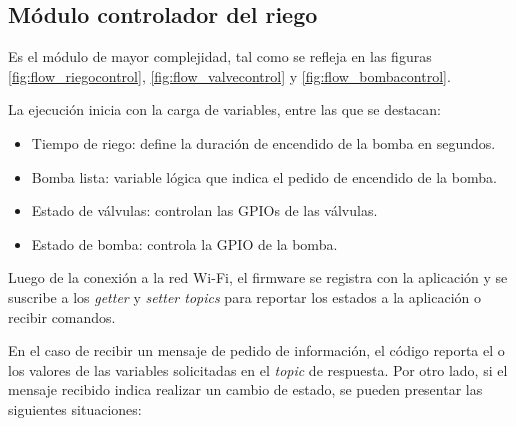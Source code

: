 \subsection{Módulo controlador del riego}
\label{Módulo controlador del riego}

Es el módulo de mayor complejidad, tal como se refleja en las figuras \ref{fig:flow_riegocontrol}, \ref{fig:flow_valvecontrol}  y \ref{fig:flow_bombacontrol}.

La ejecución inicia con la carga de variables, entre las que se destacan:
\begin{itemize}
\item Tiempo de riego: define la duración de encendido de la bomba en segundos.
\item Bomba lista: variable lógica que indica el pedido de encendido de la bomba.
\item Estado de válvulas: controlan las GPIOs de las válvulas.
\item Estado de bomba: controla la GPIO de la bomba.
\end{itemize}

Luego de la conexión a la red Wi-Fi, el firmware se registra con la aplicación y se suscribe a los \textit{getter} y \textit{setter topics} para reportar los estados a la aplicación o recibir comandos.


En el caso de recibir un mensaje de pedido de información, el código reporta el o los valores de las variables solicitadas en el \textit{topic} de respuesta. Por otro lado, si el mensaje recibido indica realizar un cambio de estado, se pueden presentar las siguientes situaciones:

